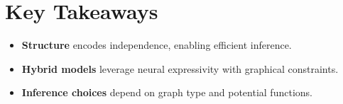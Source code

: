 
\section*{Key Takeaways}

\begin{keytakeaways}
\begin{itemize}[leftmargin=2em]
    \item \textbf{Structure} encodes independence, enabling efficient inference.
    \item \textbf{Hybrid models} leverage neural expressivity with graphical constraints.
    \item \textbf{Inference choices} depend on graph type and potential functions.
\end{itemize}
\end{keytakeaways}


